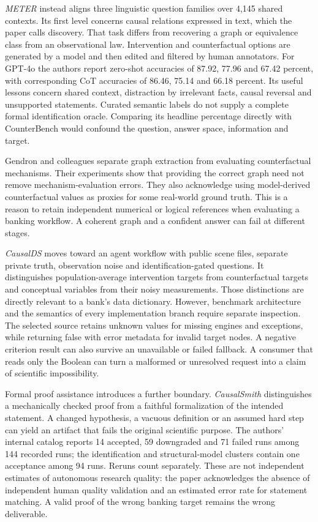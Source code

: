 \emph{METER} instead aligns three linguistic question families over 4,145 shared
contexts. Its first level concerns causal relations expressed in text, which the
paper calls discovery. That task differs from recovering a graph or equivalence
class from an observational law. Intervention and counterfactual options are
generated by a model and then edited and filtered by human annotators. For
GPT-4o the authors report zero-shot accuracies of 87.92, 77.96 and 67.42 percent,
with corresponding CoT accuracies of 86.46, 75.14 and 66.18 percent. Its useful
lessons concern shared context, distraction by irrelevant facts, causal reversal
and unsupported statements. Curated semantic labels do not supply a complete
formal identification oracle. Comparing its headline percentage directly with
CounterBench would confound the question, answer space, information and target.
\citep{exec14_ident_meter}

Gendron and colleagues separate graph extraction from evaluating counterfactual
mechanisms. Their experiments show that providing the correct graph need not
remove mechanism-evaluation errors. They also acknowledge using model-derived
counterfactual values as proxies for some real-world ground truth. This is a
reason to retain independent numerical or logical references when evaluating a
banking workflow. A coherent graph and a confident answer can fail at different
stages. \citep{v12_la_2410_06392}

\emph{CausalDS} moves toward an agent workflow with public scene files, separate
private truth, observation noise and identification-gated questions. It
distinguishes population-average intervention targets from counterfactual targets
and conceptual variables from their noisy measurements. Those distinctions are
directly relevant to a bank's data dictionary. However, benchmark architecture
and the semantics of every implementation branch require separate inspection.
The selected source retains unknown values for missing engines and exceptions,
while returning false with error metadata for invalid target nodes. A negative
criterion result can also survive an unavailable or failed fallback. A consumer
that reads only the Boolean can turn a malformed or unresolved request into a
claim of scientific impossibility. \citep{v12_la_2607_08093,exec14_ident_packages}

Formal proof assistance introduces a further boundary. \emph{CausalSmith}
distinguishes a mechanically checked proof from a faithful formalization of the
intended statement. A changed hypothesis, a vacuous definition or an assumed
hard step can yield an artifact that fails the original scientific purpose.
The authors' internal catalog reports 14 accepted, 59 downgraded and 71 failed
runs among 144 recorded runs; the identification and structural-model clusters
contain one acceptance among 94 runs. Reruns count separately. These are not
independent estimates of autonomous research quality: the paper acknowledges
the absence of independent human quality validation and an estimated error rate
for statement matching. A valid proof of the wrong banking target remains the
wrong deliverable. \citep{exec13_census_causalsmith}

